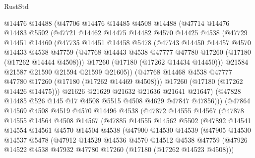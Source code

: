 \begin{lexlean}{RustStd}
\begin{coremodule}
            @14476
            @14488
            (@47706
              @14476
              @14485
              @4508
              @14488
              (@47714
                @14476
                @14483
                @5502
                (@47721
                  @14462
                  @14475
                  @14482
                  @4570
                  @14425
                  @4538
                  (@47729
                    @14451
                    @14460
                    (@47735
                      @14451
                      @14458
                      @5478
                      (@47743
                        @14450
                        @14457
                        @4570
                        @14433
                        @4538
                        @47759
                        (@47768 @14443 @4538 @47777 @47780 @17260 (@17180 (@17262 @14444 @4508)))
                        @17260
                        (@17180 (@17262 @14434 @14450)))
                      @21584
                      @21587
                      @21590
                      @21594
                      @21599
                      @21605))
                  (@47768 @14468 @4538 @47777 @47780 @17260 (@17180 (@17262 @14469 @4508)))
                  @17260
                  (@17180 (@17262 @14426 @14475)))
                @21626
                @21629
                @21632
                @21636
                @21641
                @21647)
              (@47828 @14485 @526 @145 @17 @4508 @5515 @4508 @4629 @47847 @47856)))
          (@47864
            @14569
            @4508
            @4519
            @4570
            @14496
            @4538
            (@47872
              @14555
              @14567
              (@47878
                @14555
                @14564
                @4508
                @14567
                (@47885
                  @14555
                  @14562
                  @5502
                  (@47892
                    @14541
                    @14554
                    @14561
                    @4570
                    @14504
                    @4538
                    (@47900
                      @14530
                      @14539
                      (@47905
                        @14530
                        @14537
                        @5478
                        (@47912
                          @14529
                          @14536
                          @4570
                          @14512
                          @4538
                          @47759
                          (@47926 @14522 @4538 @47932 @47780 @17260 (@17180 (@17262 @14523 @4508)))

\end{coremodule}
\end{lexlean}
